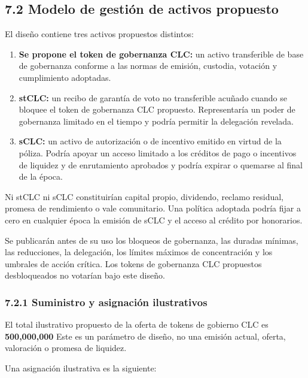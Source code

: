 \documentclass[11pt]{article}
\begin{document}
\subsection*{7.2 Modelo de gestión de activos propuesto}

El diseño contiene tres activos propuestos distintos:

\begin{enumerate}[leftmargin=*]
\item \textbf{Se propone el token de gobernanza CLC:} un activo transferible de base de gobernanza conforme a las normas de emisión, custodia, votación y cumplimiento adoptadas.
\item \textbf{stCLC:} un recibo de garantía de voto no transferible acuñado cuando se bloquee el token de gobernanza CLC propuesto. Representaría un poder de gobernanza limitado en el tiempo y podría permitir la delegación revelada.
\item \textbf{sCLC:} un activo de autorización o de incentivo emitido en virtud de la póliza. Podría apoyar un acceso limitado a los créditos de pago o incentivos de liquidez y de enrutamiento aprobados y podría expirar o quemarse al final de la época.
\end{enumerate}
Ni stCLC ni sCLC constituirían capital propio, dividendo, reclamo residual, promesa de rendimiento o vale comunitario. Una política adoptada podría fijar a cero en cualquier época la emisión de sCLC y el acceso al crédito por honorarios.

Se publicarán antes de su uso los bloqueos de gobernanza, las duradas mínimas, las reducciones, la delegación, los límites máximos de concentración y los umbrales de acción crítica. Los tokens de gobernanza CLC propuestos desbloqueados no votarían bajo este diseño.

\subsubsection*{7.2.1 Suministro y asignación ilustrativos}

El total ilustrativo propuesto de la oferta de tokens de gobierno CLC es \textbf{500,000,000} Este es un parámetro de diseño, no una emisión actual, oferta, valoración o promesa de liquidez.

Una asignación ilustrativa es la siguiente:
\end{document}
